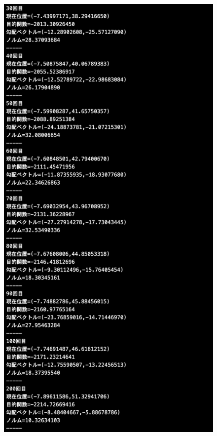 \documentclass[12pt]{jarticle}
\begin{document}
\begin{figure}[h]
    \begin{minipage}{0.5\hsize}
        \begin{center}
            \includegraphics[scale=0.2]{kadai1_2s_out3_1_2.png}
        \end{center}

\end{minipage}
\end{figure}
\end{document}
